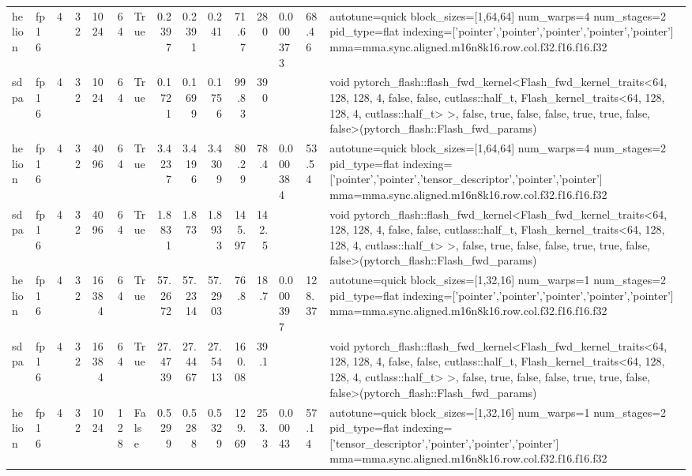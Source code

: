 \begin{table}[htbp]
\begin{tabular}{llrrrrlrrrrrlll}
    helion & fp16 & 4 & 32 & 1024 & 64 & True & 0.2397 & 0.2391 & 0.241 & 71.67 & 280 & 0.000373 & 68.46 & autotune=quick block\_sizes=[1,64,64] num\_warps=4 num\_stages=2 pid\_type=flat indexing=['pointer','pointer','pointer','pointer','pointer'] mma=mma.sync.aligned.m16n8k16.row.col.f32.f16.f16.f32 \\
    sdpa & fp16 & 4 & 32 & 1024 & 64 & True & 0.1721 & 0.1699 & 0.1756 & 99.83 & 390 &  &  & void pytorch\_flash::flash\_fwd\_kernel<Flash\_fwd\_kernel\_traits<64, 128, 128, 4, false, false, cutlass::half\_t, Flash\_kernel\_traits<64, 128, 128, 4, cutlass::half\_t> >, false, true, false, false, true, true, false, false>(pytorch\_flash::Flash\_fwd\_params) \\
    helion & fp16 & 4 & 32 & 4096 & 64 & True & 3.4237 & 3.4196 & 3.4309 & 80.29 & 78.4 & 0.000384 & 53.54 & autotune=quick block\_sizes=[1,64,64] num\_warps=4 num\_stages=2 pid\_type=flat indexing=['pointer','pointer','tensor\_descriptor','pointer','pointer'] mma=mma.sync.aligned.m16n8k16.row.col.f32.f16.f16.f32 \\
    sdpa & fp16 & 4 & 32 & 4096 & 64 & True & 1.8831 & 1.873 & 1.8933 & 145.97 & 142.5 &  &  & void pytorch\_flash::flash\_fwd\_kernel<Flash\_fwd\_kernel\_traits<64, 128, 128, 4, false, false, cutlass::half\_t, Flash\_kernel\_traits<64, 128, 128, 4, cutlass::half\_t> >, false, true, false, false, true, true, false, false>(pytorch\_flash::Flash\_fwd\_params) \\
    helion & fp16 & 4 & 32 & 16384 & 64 & True & 57.2672 & 57.2314 & 57.2903 & 76.8 & 18.7 & 0.000397 & 128.37 & autotune=quick block\_sizes=[1,32,16] num\_warps=1 num\_stages=2 pid\_type=flat indexing=['pointer','pointer','pointer','pointer','pointer'] mma=mma.sync.aligned.m16n8k16.row.col.f32.f16.f16.f32 \\
    sdpa & fp16 & 4 & 32 & 16384 & 64 & True & 27.4739 & 27.4467 & 27.5413 & 160.08 & 39.1 &  &  & void pytorch\_flash::flash\_fwd\_kernel<Flash\_fwd\_kernel\_traits<64, 128, 128, 4, false, false, cutlass::half\_t, Flash\_kernel\_traits<64, 128, 128, 4, cutlass::half\_t> >, false, true, false, false, true, true, false, false>(pytorch\_flash::Flash\_fwd\_params) \\
    helion & fp16 & 4 & 32 & 1024 & 128 & False & 0.5299 & 0.5288 & 0.5329 & 129.69 & 253.3 & 0.00043 & 57.14 & autotune=quick block\_sizes=[1,32,16] num\_warps=1 num\_stages=2 pid\_type=flat indexing=['tensor\_descriptor','pointer','pointer','pointer'] mma=mma.sync.aligned.m16n8k16.row.col.f32.f16.f16.f32 \\

\end{tabular}
\end{table}
